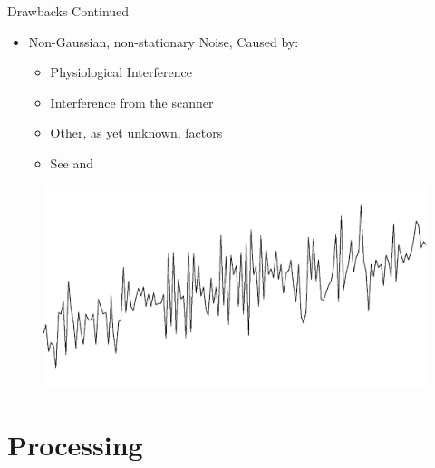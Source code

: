 \documentclass{beamer}
\begin{document}
\begin{frame}{Drawbacks Continued}
   \begin{itemize}
      \item Non-Gaussian, non-stationary Noise, Caused by:
      \begin{itemize}
        \item Physiological Interference
        \item Interference from the scanner
        \item Other, as yet unknown, factors
        \item See \cite{ISI:000080539300008} and \cite{ISI:000246766700003}
      \end{itemize}
  \end{itemize}
\begin{figure}
    \includegraphics[scale=.15]{timeseries.png}
\end{figure}
\end{frame}
    
\section{Processing}
\end{document}
